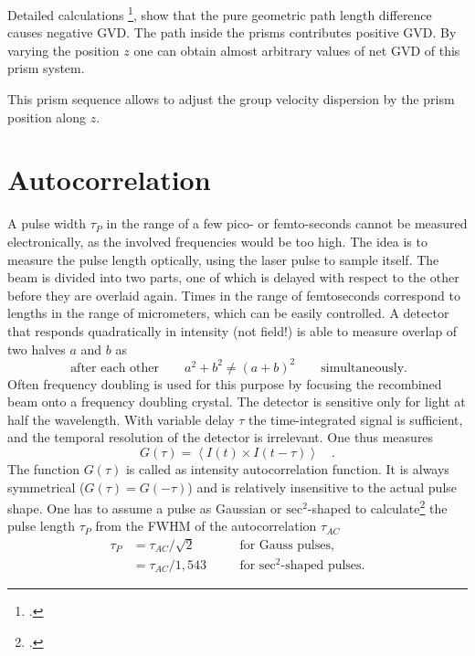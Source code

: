  Detailed calculations \footcite{DielsRudolph1996},
show that the pure geometric path length difference causes 
negative GVD. The path inside the prisms contributes  positive GVD.  By varying the position $z$ one can obtain almost arbitrary values of net GVD of this prism system.


\begin{marginfigure}
\center
   
\caption{This prism sequence allows to adjust the group velocity dispersion by the prism position along $z$. }
\label{fig_pulses_prism}
\end{marginfigure}

\section{Autocorrelation}

A pulse width $\tau_P$ in the range of a few pico- or femto-seconds cannot be measured electronically, as the involved frequencies  would be too high. The idea is to measure the pulse length optically, using the  laser pulse to sample itself. The beam is divided into two parts, one of which is delayed with respect to the other before they are overlaid again.
 Times in the 
range of femtoseconds correspond to lengths in the range of
micrometers, which can be easily controlled. A detector that responds quadratically in intensity (not field!) is able to measure  overlap of two halves $a$ and $b$ as
\begin{equation}
 \ \text{after each other} \qquad a^2 + b^2 \neq (a+b)^2 \qquad
 \text{simultaneously.}
\end{equation}
Often  frequency doubling is used for this purpose by focusing the
recombined beam onto a frequency doubling crystal.
The detector is sensitive only for light at half the wavelength. With variable delay $\tau$ the time-integrated signal is sufficient, and  the temporal resolution
of the detector is  irrelevant. One thus measures
\begin{equation}
  G(\tau) = \left< I(t) \times I(t-\tau) \right> \quad.
\end{equation}
The function $G(\tau)$ is called as intensity autocorrelation function. It is always symmetrical ($G(\tau) = G(-\tau)$) and
is relatively insensitive to the actual pulse shape.  One has to assume a pulse as Gaussian
 or
$\text{sec}^2$-shaped to calculate\footcite{DielsRudolph1996} the pulse length $\tau_{P} $ from the 
FWHM of the autocorrelation
$\tau_{AC}$ 
\begin{align}
  \tau_{P} &= \tau_{AC} / \sqrt{2} &\quad& \text{for Gauss pulses,} \\
           &= \tau_{AC} / 1,543 && \text{for $\text{sec}^2$-shaped pulses.}
\end{align}


